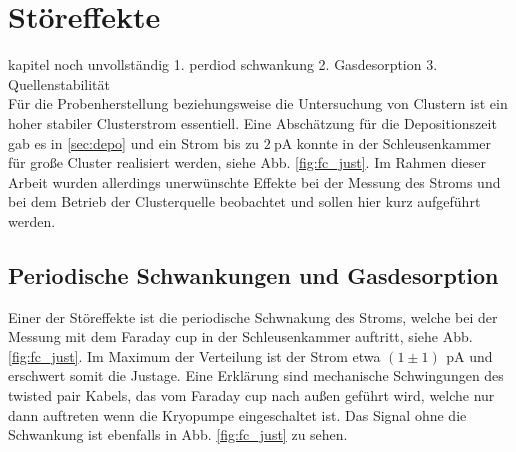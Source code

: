 \section{Störeffekte}
\label{sec:effekte}
kapitel noch unvollständig 1. perdiod schwankung 2. Gasdesorption 3. Quellenstabilität \\
Für die Probenherstellung beziehungsweise die Untersuchung von Clustern ist ein hoher stabiler Clusterstrom essentiell.
Eine Abschätzung für die Depositionszeit gab es in \ref{sec:depo} und ein Strom bis zu $\SI{2}{\pA}$ konnte in der Schleusenkammer für große Cluster realisiert werden, siehe Abb. \ref{fig:fc_just}.
Im Rahmen dieser Arbeit wurden allerdings unerwünschte Effekte bei der Messung des Stroms und bei dem Betrieb der Clusterquelle beobachtet und sollen hier kurz aufgeführt werden.

\subsection{Periodische Schwankungen und Gasdesorption}
Einer der Störeffekte ist die periodische Schwnakung des Stroms, welche bei der Messung mit dem Faraday cup in der Schleusenkammer auftritt, siehe Abb. \ref{fig:fc_just}.
Im Maximum der Verteilung ist der Strom etwa $(1\pm 1)\,\SI{}{\pA}$ und erschwert somit die Justage.
Eine Erklärung sind mechanische Schwingungen des twisted pair Kabels, das vom Faraday cup nach außen geführt wird, welche nur dann auftreten wenn die Kryopumpe eingeschaltet ist.
Das Signal ohne die Schwankung ist ebenfalls in Abb. \ref{fig:fc_just} zu sehen.\\

